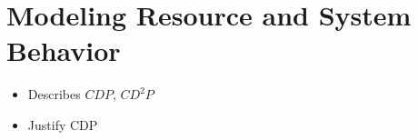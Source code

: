 \section{Modeling Resource and System Behavior}
\label{sec:modeling}

\begin{itemize}
  \item Describes $CDP$, $CD^2P$
  \item Justify CDP
\end{itemize}	
